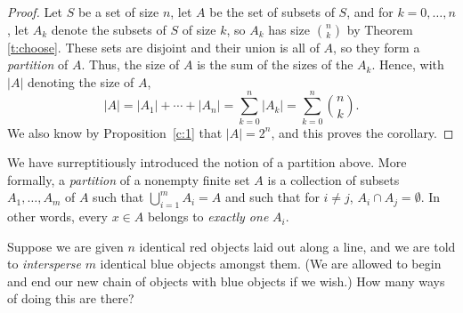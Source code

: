 \documentclass[11pt,dvipsnames]{book}
\numberwithin{equation}{section} %
\numberwithin{figure}{section} %
\numberwithin{table}{section} %
\begin{document}
\begin{proof}
Let $S$ be a set of size $n$, let $A$ be the set of subsets of $S$, and for $k=0, \dots ,n$, let $A_k$ denote the subsets of $S$ of size $k$, so $A_{k}$ has size ${n\choose k}$ by Theorem \ref{t:choose}. These sets are disjoint and their union is all of $A$, so they form a {\em partition} of $A$. Thus, the size of $A$ is the sum of the sizes of the $A_{k}$. Hence, with $|A|$ denoting the size of $A$,
\[|A|=|A_{1}|+\cdots + |A_{n}|= \sum_{k=0}^{n} |A_{k}|=\sum_{k=0}^{n}{n\choose k}. 
\]
We also know by Proposition~\ref{c:1} that $|A|=2^{n}$, and this proves the corollary.
\end{proof}

We have surreptitiously introduced the notion of a partition above. More formally, a {\em partition} of a nonempty finite set $A$ is a collection of subsets $A_1, \dots , A_m$ of $A$ such that $\bigcup_{i=1}^m A_i = A$ and such that for $i \neq j$, $A_i \cap A_j = \emptyset$. In other words, every $x \in A$ belongs to {\em exactly one} $A_i$.


%
%



%

\bigskip
Suppose we are given $n$ identical red objects laid out along a line, and we are told to {\em intersperse} $m$ identical blue objects amongst them. (We are allowed to begin and end our new chain of objects with blue objects if we wish.) How many ways of doing this are there?
\end{document}
